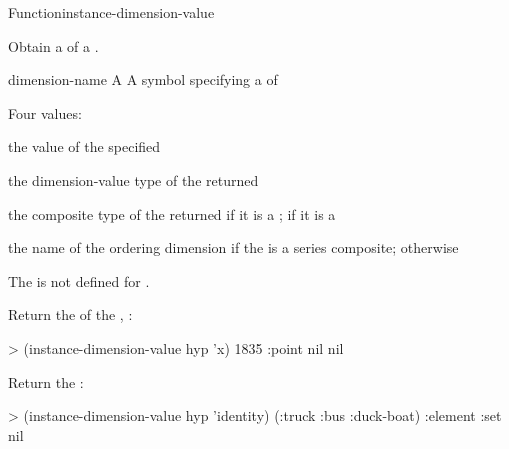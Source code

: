 \documentclass[10pt,twoside,english,pdftex]{article}
\begin{document}
\begin{functiondoc}{Function}{instance-dimension-value}%
  { \returns{} 
  \mbox{}}
%
%

\fnsyntax

\fnpurpose Obtain a  of a .

\fnpackage {}

\fnmodule {}

\fnargs
\begin{args}{dimension-name}
 A 
 A symbol specifying a  of
\end{args}

\fnreturns Four values: 
\begin{tightitemize}
\item the value of the specified 
\item the dimension-value type of the returned 
\item the composite type of the returned  if it is a
  ; \nil{} if it is a
\item the name of the ordering dimension if the  is a
  series composite; \nil{} otherwise
\end{tightitemize}

\fnerrors The   is not defined for
. 

\fnexamples
Return the   of the ,
:
\begin{example}
> (instance-dimension-value hyp 'x)
1835
:point
nil
nil
\end{example}
Return the  :
\begin{example}
> (instance-dimension-value hyp 'identity)
(:truck :bus :duck-boat)
:element
:set
nil
\end{example}

\end{functiondoc}

\end{document}
